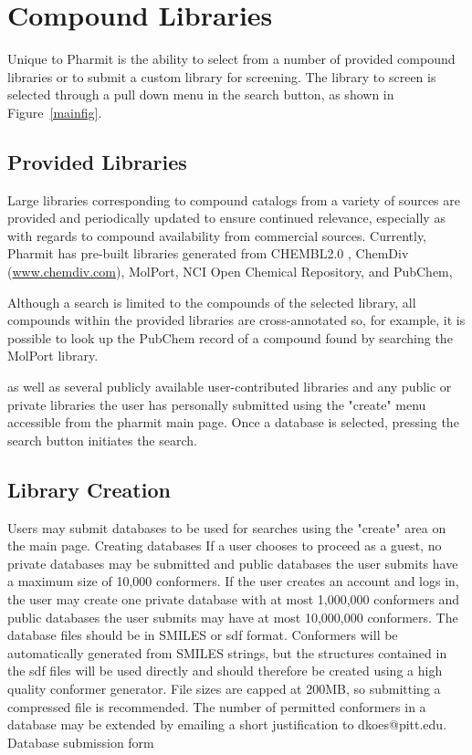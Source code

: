 \section{Compound Libraries}

Unique to Pharmit is the ability to select from a number of provided compound libraries or to submit a custom library for screening.  The library to screen is selected through a pull down menu in the search button, as shown in Figure~\ref{mainfig}.  

\subsection{Provided Libraries}

Large libraries corresponding to compound catalogs from a variety of sources are provided and periodically updated to ensure continued relevance, especially as with regards to compound availability from commercial sources.  Currently, Pharmit has pre-built libraries generated from CHEMBL2.0 \cite{Gaulton_2011}, ChemDiv (\hyperref[http://www.chemdiv.com/]{www.chemdiv.com}), MolPort, NCI Open Chemical Repository, and PubChem, 
 
 
 Although a search is limited to the compounds of the selected library, all compounds within the provided libraries are cross-annotated so, for example, it is possible to look up the PubChem record of a compound found by searching the MolPort library.
 
 as well as several publicly available user-contributed libraries and any public or private libraries the user has personally submitted using the "create" menu accessible from the pharmit main page. Once a database is selected, pressing the search button initiates the search. 

\subsection{Library Creation}
Users may submit databases to be used for searches using the "create" area on the main page. Creating databases
If a user chooses to proceed as a guest, no private databases may be submitted and public databases the user submits have a maximum size of 10,000 conformers. If the user creates an account and logs in, the user may create one private database with at most 1,000,000 conformers and public databases the user submits may have at most 10,000,000 conformers. The database files should be in SMILES or sdf format. Conformers will be automatically generated from SMILES strings, but the structures contained in the sdf files will be used directly and should therefore be created using a high quality conformer generator. File sizes are capped at 200MB, so submitting a compressed file is recommended. The number of permitted conformers in a database may be extended by emailing a short justification to dkoes@pitt.edu. 
Database submission form